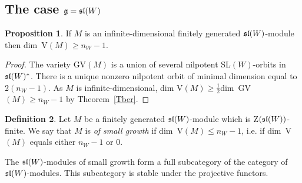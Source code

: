 \documentclass[12pt]{amsart}
\theoremstyle{definition}\newtheorem{theorem}{Theorem}[section]
\newtheorem{proposition}{Proposition}[section]
\theoremstyle{definition}\newtheorem{definition}[proposition]{Definition}
\theoremstyle{remark}\newtheorem{example}[proposition]{Example}
\begin{document}
\subsection{The case $\frak g=\frak{sl}(W)$}
\begin{proposition}If $M$ is an infinite-dimensional finitely generated $\frak{sl}(W)$-module then dim~V$(M)\ge n_W-1$.\end{proposition}
\begin{proof}The variety GV$(M)$ is a union of several nilpotent SL$(W)$-orbits in $\frak{sl}(W)^*$. There is a unique nonzero nilpotent orbit of minimal dimension equal to 2$(n_W-1)$. As $M$ is infinite-dimensional, dim V$(M)\ge\frac{1}{2}$dim~GV$(M)\ge n_W-1$ by Theorem~\ref{Tber}.\end{proof}
\begin{definition}Let $M$ be a finitely generated $\frak{sl}(W)$-module which is Z$(\frak{sl}(W))$-finite. We say that $M$ is {\it of small growth} if dim~V$(M)\le n_W-1$, i.e. if dim~V$(M)$ equals either $n_W-1$ or 0.\end{definition}
The $\frak{sl}(W)$-modules of small growth form a full subcategory of the category of $\frak{sl}(W)$-modules. This subcategory is stable under the projective functors.
\end{document}

